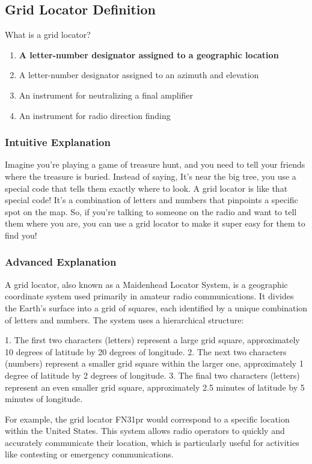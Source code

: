 \subsection{Grid Locator Definition}
\label{T8C05}

\begin{tcolorbox}[colback=gray!10!white,colframe=black!75!black,title=T8C05]
What is a grid locator?  
\begin{enumerate}[label=\Alph*)]
    \item \textbf{A letter-number designator assigned to a geographic location}
    \item A letter-number designator assigned to an azimuth and elevation
    \item An instrument for neutralizing a final amplifier
    \item An instrument for radio direction finding
\end{enumerate}
\end{tcolorbox}

\subsubsection{Intuitive Explanation}
Imagine you’re playing a game of treasure hunt, and you need to tell your friends where the treasure is buried. Instead of saying, It’s near the big tree, you use a special code that tells them exactly where to look. A grid locator is like that special code! It’s a combination of letters and numbers that pinpoints a specific spot on the map. So, if you’re talking to someone on the radio and want to tell them where you are, you can use a grid locator to make it super easy for them to find you!

\subsubsection{Advanced Explanation}
A grid locator, also known as a Maidenhead Locator System, is a geographic coordinate system used primarily in amateur radio communications. It divides the Earth’s surface into a grid of squares, each identified by a unique combination of letters and numbers. The system uses a hierarchical structure:

1. The first two characters (letters) represent a large grid square, approximately 10 degrees of latitude by 20 degrees of longitude.
2. The next two characters (numbers) represent a smaller grid square within the larger one, approximately 1 degree of latitude by 2 degrees of longitude.
3. The final two characters (letters) represent an even smaller grid square, approximately 2.5 minutes of latitude by 5 minutes of longitude.

For example, the grid locator FN31pr would correspond to a specific location within the United States. This system allows radio operators to quickly and accurately communicate their location, which is particularly useful for activities like contesting or emergency communications.

